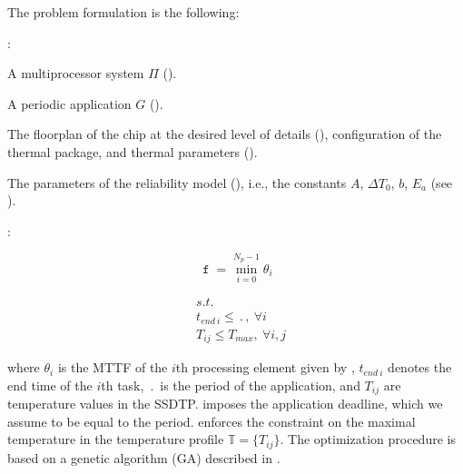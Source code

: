 The problem formulation is the following:

:
\begin{ilist}
  \item A multiprocessor system $\Pi$ ().
  \item A periodic application $G$ ().
  \item The floorplan of the chip at the desired level of details (), configuration of the thermal package, and thermal parameters ().
  \item The parameters of the reliability model (), i.e., the constants $A$, $\Delta T_0$, $b$, $E_a$ (see ).
\end{ilist}

:\vspace{-5pt}

\begin{minipage}{0.35\linewidth}
  \begin{equation} \label{eq:fitness-function}
    \mttf = \min_{i = 0}^{N_p - 1} \theta_i
  \end{equation}
\end{minipage}
\begin{minipage}{0.6\linewidth}
  \begin{align}
    & s.t. \nonumber \\
    & t_{end \: i} \leq \period, \: \forall i \label{eq:deadline} \\
    & T_{ij} \leq T_{max}, \: \forall i, j \label{eq:t-max}
  \end{align}
\end{minipage}\vspace{5pt}
where $\theta_i$ is the MTTF of the $i$th processing element given by , $t_{end \: i}$ denotes the end time of the $i$th task, $\period$ is the period of the application, and $T_{ij}$ are temperature values in the SSDTP.  imposes the application deadline, which we assume to be equal to the period.  enforces the constraint on the maximal temperature in the temperature profile $\mathbb{T} = \{ T_{ij} \}$. The optimization procedure is based on a genetic algorithm (GA) described in .
